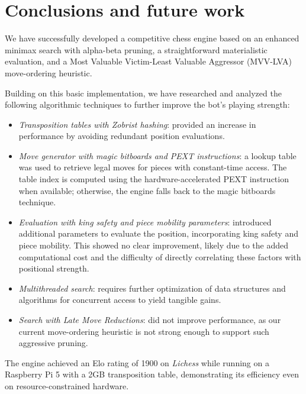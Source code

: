 \chapter{Conclusions and future work}

We have successfully developed a competitive chess engine based on an enhanced minimax search with alpha-beta pruning, a straightforward materialistic evaluation, and a Most Valuable Victim-Least Valuable Aggressor (MVV-LVA) move-ordering heuristic.

\vspace{1em}

\noindent Building on this basic implementation, we have researched and analyzed the following algorithmic techniques to further improve the bot's playing strength:

\begin{itemize}[itemsep=1pt]

    \item \textit{Transposition tables with Zobrist hashing}: provided an increase in performance by avoiding redundant position evaluations.
    
    \item \textit{Move generator with magic bitboards and PEXT instructions}: a lookup table was used to retrieve legal moves for pieces with constant-time access. The table index is computed using the hardware-accelerated PEXT instruction when available; otherwise, the engine falls back to the magic bitboards technique.
    
    \item \textit{Evaluation with king safety and piece mobility parameters}: introduced additional parameters to evaluate the position, incorporating king safety and piece mobility. This showed no clear improvement, likely due to the added computational cost and the difficulty of directly correlating these factors with positional strength.
    
    \item \textit{Multithreaded search}: requires further optimization of data structures and algorithms for concurrent access to yield tangible gains.
    
    \item \textit{Search with Late Move Reductions}: did not improve performance, as our current move-ordering heuristic is not strong enough to support such aggressive pruning.
\end{itemize}

\noindent The engine achieved an Elo rating of 1900 on \textit{Lichess} while running on a Raspberry Pi 5 with a 2GB transposition table, demonstrating its efficiency even on resource-constrained hardware.

